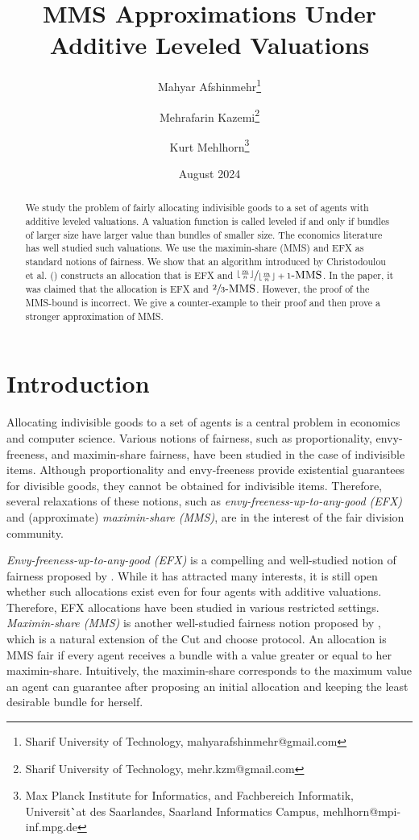 \documentclass{article}
\title{MMS Approximations Under Additive Leveled Valuations}
\author{Mahyar Afshinmehr\footnote{Sharif University of Technology, {mahyarafshinmehr@gmail.com}} \and  Mehrafarin Kazemi\footnote{Sharif University of Technology, {mehr.kzm@gmail.com}} \and Kurt Mehlhorn\footnote{Max Planck Institute for Informatics,  and Fachbereich Informatik, Universit\``at des Saarlandes, Saarland Informatics Campus, {mehlhorn@mpi-inf.mpg.de}}}
\date{August 2024}
\theoremstyle{definition}
\begin{document}
\maketitle

\begin{abstract}
    We study the problem of fairly allocating indivisible goods to a set of agents with additive leveled valuations. A valuation function is called leveled if and only if bundles of larger size have larger value than bundles of smaller size. The economics literature has well studied such valuations.
    We use the maximin-share (MMS) and EFX as standard notions of fairness. We show that an algorithm introduced by Christodoulou et al. (\cite{christodoulou2024fairtruthfulallocationsleveled}) constructs an allocation that is EFX and $\sfrac{\lfloor \frac{m}{n} \rfloor}{\lfloor \frac{m}{n} \rfloor + 1}\text{-MMS}$. In the paper, it was claimed that the allocation is EFX and $\sfrac{2}{3}\text{-MMS}$. However, the proof of the MMS-bound is incorrect. We give a counter-example to their proof and then prove a stronger approximation of MMS. 
\end{abstract}


\section{Introduction}

Allocating indivisible goods to a set of agents is a central problem in economics and computer science. Various notions of fairness, such as proportionality, envy-freeness, and maximin-share fairness, have been studied in the case of indivisible items. Although proportionality and envy-freeness provide existential guarantees for divisible goods, they cannot be obtained for indivisible items. Therefore, several relaxations of these notions, such as \emph{envy-freeness-up-to-any-good (EFX)} and (approximate) \emph{maximin-share (MMS)}, are in the interest of the fair division community.

\emph{Envy-freeness-up-to-any-good (EFX)} is a compelling and well-studied notion of fairness proposed by \cite{10.1145/3355902}. While it has attracted many interests, it is still open whether such allocations exist even for four agents with additive valuations. Therefore, EFX allocations have been studied in various restricted settings. \emph{Maximin-share (MMS)} is another well-studied fairness notion proposed by \cite{RePEc:ucp:jpolec:doi:10.1086/664613}, which is a natural extension of the Cut and choose protocol. An allocation is MMS fair if every agent receives a bundle with a value greater or equal to her maximin-share. Intuitively, the maximin-share corresponds to the maximum value an agent can guarantee after proposing an initial allocation and keeping the least desirable bundle for herself.
\end{document}

